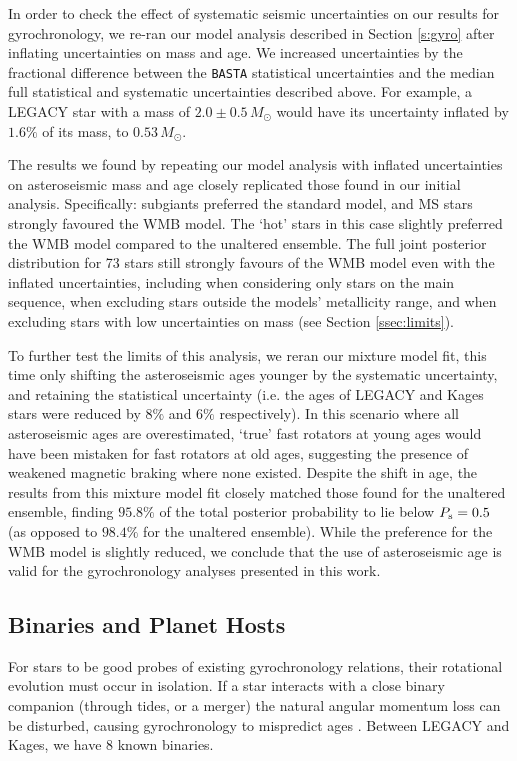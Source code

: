 \documentclass[12pt]{article}
\begin{document}
In order to check the effect of systematic seismic uncertainties on our results for gyrochronology, we re-ran our model analysis described in Section \ref{s:gyro} after inflating uncertainties on mass and age. We increased uncertainties by the fractional difference between the \texttt{BASTA} statistical uncertainties and the median full statistical and systematic uncertainties described above. For example, a LEGACY star with a mass of $2.0 \pm 0.5\, M_\odot$ would have its uncertainty inflated by $1.6\%$ of its mass, to $0.53\, M_\odot$.

The results we found by repeating our model analysis with inflated uncertainties on asteroseismic mass and age closely replicated those found in our initial analysis. Specifically: subgiants preferred the standard model, and MS stars strongly favoured the WMB model. The `hot' stars in this case slightly preferred the WMB model compared to the unaltered ensemble. The full joint posterior distribution for 73 stars still strongly favours of the WMB model even with the inflated uncertainties, including when considering only stars on the main sequence, when excluding stars outside the models' metallicity range, and when excluding stars with low uncertainties on mass (see Section \ref{ssec:limits}).

To further test the limits of this analysis, we reran our mixture model fit, this time only shifting the asteroseismic ages younger by the systematic uncertainty, and retaining the statistical uncertainty (i.e. the ages of LEGACY and Kages stars were reduced by $8\%$ and $6\%$ respectively). In this scenario where all asteroseismic ages are overestimated, `true' fast rotators at young ages would have been mistaken for fast rotators at old ages, suggesting the presence of weakened magnetic braking where none existed. Despite the shift in age, the results from this mixture model fit closely matched those found for the unaltered ensemble, finding $95.8\%$ of the total posterior probability to lie below $P_{\rm s} = 0.5$ (as opposed to $98.4\%$ for the unaltered ensemble). While the preference for the WMB model is slightly reduced, we conclude that the use of asteroseismic age is valid for the gyrochronology analyses presented in this work.

\subsection{Binaries and Planet Hosts}
For stars to be good probes of existing gyrochronology relations, their rotational evolution must occur in isolation. If a star interacts with a close binary companion (through tides, or a merger) the natural angular momentum loss can be disturbed, causing gyrochronology to mispredict ages \cite{leiner+2019, fleming+2019}. Between LEGACY and Kages, we have 8 known binaries. 
\end{document}
